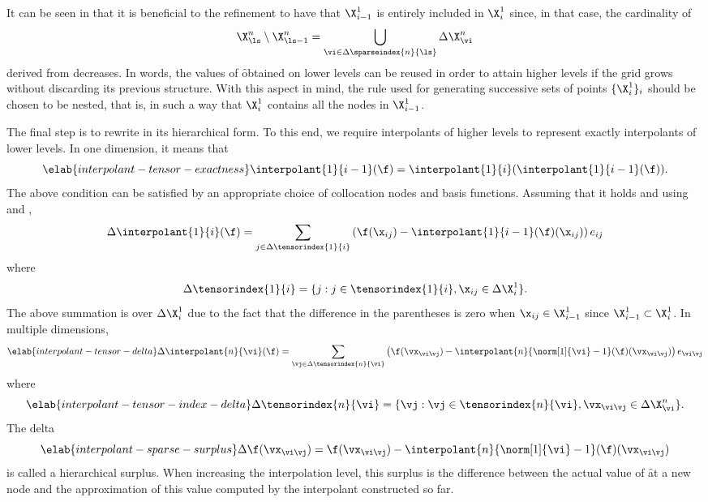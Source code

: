 It can be seen in  that it is beneficial to the
refinement to have that $\X^1_{i - 1}$ is entirely included in $\X^1_i$ since,
in that case, the cardinality of
\[
  \X^n_{\ls} \setminus \X^n_{\ls - 1} = \bigcup_{\vi \in \Delta\sparseindex{n}{\ls}} \Delta\X^n_{\vi}
\]
derived from  decreases. In words, the values of
\f obtained on lower levels can be reused in order to attain higher levels if
the grid grows without discarding its previous structure. With this aspect in
mind, the rule used for generating successive sets of points $\{ \X^1_i \}_i$
should be chosen to be nested, that is, in such a way that $\X^1_i$ contains all
the nodes in $\X^1_{i - 1}$.

The final step is to rewrite  in its
hierarchical form. To this end, we require interpolants of higher levels to
represent exactly interpolants of lower levels. In one dimension, it means that
\begin{equation} \elab{interpolant-tensor-exactness}
  \interpolant{1}{i - 1}(\f) = \interpolant{1}{i}(\interpolant{1}{i - 1}(\f)).
\end{equation}
The above condition can be satisfied by an appropriate choice of collocation
nodes and basis functions. Assuming that it holds and using
 and ,
\[
  \Delta\interpolant{1}{i}(\f) = \sum_{j \in \Delta\tensorindex{1}{i}} \left(\f(\x_{ij}) - \interpolant{1}{i - 1}(\f)(\x_{ij})\right) e_{ij}
\]
where
\[
  \Delta\tensorindex{1}{i} = \{ j: j \in \tensorindex{1}{i}, \x_{ij} \in \Delta\X^1_i \}.
\]
The above summation is over $\Delta\X^1_i$ due to the fact that the difference
in the parentheses is zero when $\x_{ij} \in \X^1_{i - 1}$ since $\X^1_{i - 1}
\subset \X^1_i$. In multiple dimensions,
\begin{equation} \elab{interpolant-tensor-delta}
  \Delta\interpolant{n}{\vi}(\f) = \sum_{\vj \in \Delta\tensorindex{n}{\vi}} \left(\f(\vx_{\vi \vj}) - \interpolant{n}{\norm[1]{\vi} - 1}(\f)(\vx_{\vi \vj})\right) e_{\vi \vj}
\end{equation}
where
\begin{equation} \elab{interpolant-tensor-index-delta}
  \Delta\tensorindex{n}{\vi} = \{ \vj: \vj \in \tensorindex{n}{\vi}, \vx_{\vi \vj} \in \Delta\X^n_{\vi} \}.
\end{equation}
The delta
\begin{equation} \elab{interpolant-sparse-surplus}
  \Delta\f(\vx_{\vi \vj}) = \f(\vx_{\vi \vj}) - \interpolant{n}{\norm[1]{\vi} - 1}(\f)(\vx_{\vi \vj})
\end{equation}
is called a hierarchical surplus. When increasing the interpolation level, this
surplus is the difference between the actual value of \f at a new node and the
approximation of this value computed by the interpolant constructed so far.


